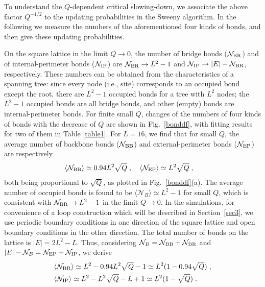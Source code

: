 \documentclass[aps,pre,twocolumn,superscriptaddress,longbibliography,floatfix]{revtex4-2}
\begin{document}
To understand the $Q$-dependent critical slowing-down, we associate the above factor $Q^{-1/2}$ to the updating probabilities in the Sweeny algorithm. In the following we measure the numbers of the aforementioned four kinds of bonds, and
then give these updating probabilities.

On the square lattice in the limit $Q \to 0$, the number of bridge bonds ($\mathcal{N}_{\rm BR}$) and of internal-perimeter bonds ($\mathcal{N}_{\rm IP}$) are $\mathcal{N}_{\rm BR} \to L^2-1$ and $\mathcal{N}_{\rm IP} \to |E|- \mathcal{N}_{\rm BR}$, respectively. 
These numbers can be obtained from the characteristics of a spanning tree: since every node (i.e., site) corresponds to an occupied bond except the root, there are $L^2-1$ occupied bonds for a tree with $L^2$ nodes; the $L^2-1$ occupied bonds are all bridge bonds, and other (empty) bonds are internal-perimeter bonds. For finite small $Q$, changes of the numbers of four kinds of bonds with the decrease of $Q$ are shown in Fig.~\ref{bonddf}, with fitting results for two of them in Table \ref{table1}. 
For $L=16$, we find that for small $Q$, the average number of backbone bonds ($\mathcal{N}_{\rm BB}$) and external-perimeter bonds ($\mathcal{N}_{\rm EP}$) are respectively
\begin{align}
    &\langle\mathcal{N}_{\rm BB}\rangle \simeq 0.94L^2\sqrt{Q} \;,\quad   \langle\mathcal{N}_{\rm EP}\rangle \simeq L^2\sqrt{Q} \;,
\label{dfbond0}
\end{align}
both being proportional to $\sqrt{Q}$, as plotted in Fig.~\ref{bonddf}(a). 
The average number of occupied bonds is found to be $\langle \mathcal{N}_B \rangle \simeq L^2 - 1$ for small $Q$, which is consistent with $\mathcal{N}_{\rm BR} \to L^2-1$ in the limit $Q \to 0$. In the simulations, for convenience of a loop construction which will be described in Section~\ref{sec3}, we use periodic boundary conditions in one direction of the square lattice and open boundary conditions in the other direction. The total number of bonds on the lattice is $|E|=2L^2-L$. Thus, considering $\mathcal{N}_B=\mathcal{N}_{\rm BB}+\mathcal{N}_{\rm BR}$ and $|E|-\mathcal{N}_B=\mathcal{N}_{\rm EP}+\mathcal{N}_{\rm IP}$, we derive
\begin{align}
    &\langle\mathcal{N}_{\rm BR}\rangle \simeq L^2 - 0.94L^2\sqrt{Q} -1 \simeq L^2(1 - 0.94\sqrt{Q}) \;, \nonumber \\
    &\langle\mathcal{N}_{\rm IP}\rangle \simeq L^2 - L^2\sqrt{Q} - L + 1 \simeq L^2 (1-\sqrt{Q}) \;.
\label{dfbond1}
\end{align}
\end{document}

